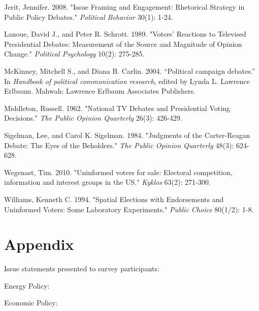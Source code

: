 \documentclass[12pt]{article}
\begin{document}
{{{{\begin{thebibliography}{20}
 Jerit, Jennifer. 2008. "Issue Framing and Engagement: Rhetorical Strategy in Public Policy Debates." \emph{Political Behavior} 30(1): 1-24.

 Lanoue, David J., and Peter R. Schrott. 1989. "Voters' Reactions to Televised Presidential Debates: Measurement of the Source and Magnitude of Opinion Change." \emph{Political Psychology} 10(2): 275-285. 

 McKinney, Mitchell S., and Diana B. Carlin. 2004. “Political campaign debates.” In \emph{Handbook of political communication research}, edited by Lynda L. Lawrence Erlbaum. Mahwah: Lawrence Erlbaum Associates Publishers.

 Middleton, Russell. 1962. "National TV Debates and Presidential Voting Decisions." \emph{The Public Opinion Quarterly} 26(3): 426-429. 

 Sigelman, Lee, and Carol K. Sigelman. 1984. "Judgments of the Carter-Reagan Debate: The Eyes of the Beholders." \emph{The Public Opinion Quarterly} 48(3): 624-628.

 Wegenast, Tim. 2010. "Uninformed voters for sale: Electoral competition, information and interest groups in the US." \emph{Kyklos} 63(2): 271-300.

 Williams, Kenneth C. 1994. "Spatial Elections with Endorsements and Uninformed Voters: Some Laboratory Experiments." \emph{Public Choice} 80(1/2): 1-8.

\section*{Appendix}

Issue statements presented to survey participants:

Energy Policy:\\

Economic Policy:\\


\end{thebibliography}}}}}
\end{document}
